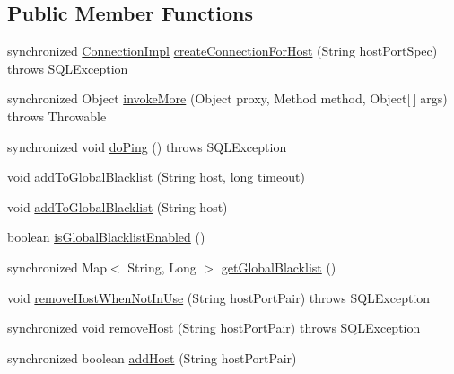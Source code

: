 \subsection*{Public Member Functions}
\begin{DoxyCompactItemize}
\item 
synchronized \mbox{\hyperlink{classcom_1_1mysql_1_1jdbc_1_1_connection_impl}{Connection\+Impl}} \mbox{\hyperlink{classcom_1_1mysql_1_1jdbc_1_1_load_balanced_connection_proxy_a8ab535276152fa3a1aa8621cf3fb1c68}{create\+Connection\+For\+Host}} (String host\+Port\+Spec)  throws S\+Q\+L\+Exception 
\item 
synchronized Object \mbox{\hyperlink{classcom_1_1mysql_1_1jdbc_1_1_load_balanced_connection_proxy_ae2cd16fd57c22bbaf99664f34f67d8fc}{invoke\+More}} (Object proxy, Method method, Object\mbox{[}$\,$\mbox{]} args)  throws Throwable 
\item 
synchronized void \mbox{\hyperlink{classcom_1_1mysql_1_1jdbc_1_1_load_balanced_connection_proxy_a95d3c42279e542a072f66457d990d101}{do\+Ping}} ()  throws S\+Q\+L\+Exception 
\item 
void \mbox{\hyperlink{classcom_1_1mysql_1_1jdbc_1_1_load_balanced_connection_proxy_a93dad34c094b301be7cb59b0fe7c01da}{add\+To\+Global\+Blacklist}} (String host, long timeout)
\item 
void \mbox{\hyperlink{classcom_1_1mysql_1_1jdbc_1_1_load_balanced_connection_proxy_a9b1718c334191c26cb1befc847cd8aad}{add\+To\+Global\+Blacklist}} (String host)
\item 
boolean \mbox{\hyperlink{classcom_1_1mysql_1_1jdbc_1_1_load_balanced_connection_proxy_ad91c83a171c79295fa29cfdca16cc89f}{is\+Global\+Blacklist\+Enabled}} ()
\item 
synchronized Map$<$ String, Long $>$ \mbox{\hyperlink{classcom_1_1mysql_1_1jdbc_1_1_load_balanced_connection_proxy_a409f26f6bf39d9504c4d5c701a01c337}{get\+Global\+Blacklist}} ()
\item 
void \mbox{\hyperlink{classcom_1_1mysql_1_1jdbc_1_1_load_balanced_connection_proxy_af3322f74308fe5ca51f73f36f99aa12f}{remove\+Host\+When\+Not\+In\+Use}} (String host\+Port\+Pair)  throws S\+Q\+L\+Exception 
\item 
synchronized void \mbox{\hyperlink{classcom_1_1mysql_1_1jdbc_1_1_load_balanced_connection_proxy_a671d1d7d042aa5164bf1078996303433}{remove\+Host}} (String host\+Port\+Pair)  throws S\+Q\+L\+Exception 
\item 
synchronized boolean \mbox{\hyperlink{classcom_1_1mysql_1_1jdbc_1_1_load_balanced_connection_proxy_afad99a08e4cfd9adad2936525d56d49e}{add\+Host}} (String host\+Port\+Pair)

\end{DoxyCompactItemize}
